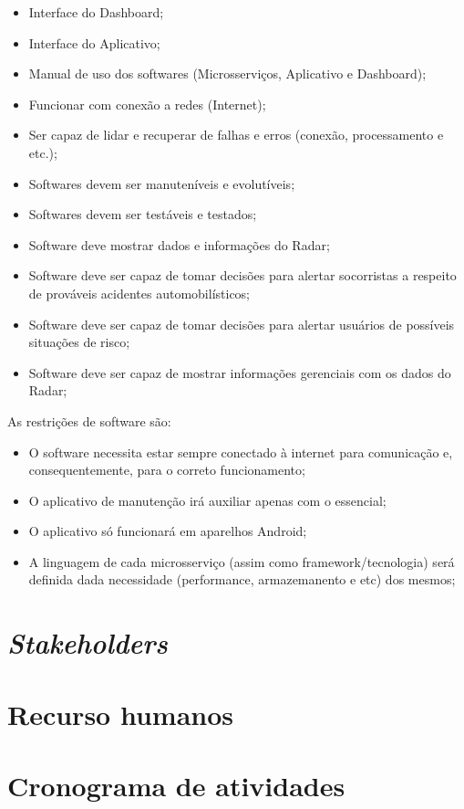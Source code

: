 \begin{itemize}
    \item Interface do Dashboard;
    \item Interface do Aplicativo;
    \item Manual de uso dos softwares (Microsserviços, Aplicativo e Dashboard);
    \item Funcionar com conexão a redes (Internet);
    \item Ser capaz de lidar e recuperar de falhas e erros (conexão, processamento e etc.);
    \item Softwares devem ser manuteníveis e evolutíveis;
    \item Softwares devem ser testáveis e testados;
    \item Software deve mostrar dados e informações do Radar;
    \item Software deve ser capaz de tomar decisões para alertar socorristas a respeito de prováveis acidentes automobilísticos;
    \item Software deve ser capaz de tomar decisões para alertar usuários de possíveis situações de risco;
    \item Software deve ser capaz de mostrar informações gerenciais com os dados do Radar;
\end{itemize}

As restrições de software são:

\begin{itemize}
    \item O software necessita estar sempre conectado à internet para comunicação e, consequentemente, para o correto funcionamento;
    \item O aplicativo de manutenção irá auxiliar apenas com o essencial;
    \item O aplicativo só funcionará em aparelhos Android;
    \item A linguagem de cada microsserviço (assim como framework/tecnologia) será definida dada necessidade (performance, armazemanento e etc) dos mesmos;
\end{itemize}

\section{\emph{Stakeholders}}
\section{Recurso humanos}
\section{Cronograma de atividades}
